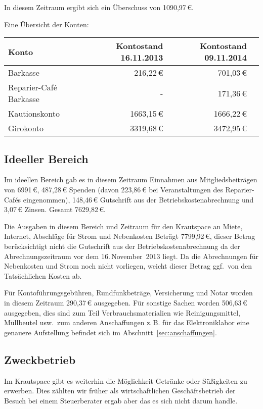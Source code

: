 \documentclass[10pt,DIV16]{scrartcl}
\begin{document}
In diesem Zeitraum ergibt sich ein Überschuss von 1090,97\,\euro{}.

Eine Übersicht der Konten:
\begin{table}[h!]
	\begin{tabular}{l|r|r|r}
	\textbf{Konto} & \textbf{Kontostand 16.11.2013} & \textbf{Kontostand 09.11.2014} \\ \hline
	Barkasse & 216,22\,\euro & 701,03\,\euro \\
	Reparier-Café Barkasse & - & 171,36\,\euro \\
	Kautionskonto & 1663,15\,\euro & 1666,22\,\euro \\
	Girokonto & 3319,68\,\euro & 3472,95\,\euro \\
	\end{tabular}
\end{table}

\subsection{Ideeller Bereich}
\label{sec:ideeller_bereich}

Im ideellen Bereich gab es in diesem Zeitraum Einnahmen aus Mitgliedsbeiträgen von 6991\,\euro{}, 487,28\,\euro{} Spenden (davon 223,86\,\euro{} bei Veranstaltungen des Reparier-Cafés eingenommen), 148,46\,\euro{} Gutschrift aus der Betriebskostenabrechnung und 3,07\,\euro{} Zinsen.
Gesamt 7629,82\,\euro{}.

Die Ausgaben in diesem Bereich und Zeitraum für den Krautspace an Miete, Internet, Abschläge für Strom und Nebenkosten Beträgt 7799,92\,\euro{}, dieser Betrag berücksichtigt nicht die Gutschrift aus der Betriebskostenabrechnung da der Abrechnungszeitraum vor dem 16.\,November~2013 liegt.
Da die Abrechnungen für Nebenkosten und Strom noch nicht vorliegen, weicht dieser Betrag ggf.\ von den Tatsächlichen Kosten ab.

Für Kontoführungsgebühren, Rundfunkbeträge, Versicherung und Notar worden in diesem Zeitraum 290,37\,\euro{} ausgegeben.
Für sonstige Sachen worden 506,63\,\euro{} ausgegeben, dies sind zum Teil Verbrauchsmaterialien wie Reinigungsmittel, Müllbeutel usw.\ zum anderen Anschaffungen z.\,B. für das Elektroniklabor eine genauere Aufstellung befindet sich im Abschnitt~\ref{sec:anschaffungen}.

\subsection{Zweckbetrieb}
\label{sec:Zweckbetrieb}
Im Krautspace gibt es weiterhin die Möglichkeit Getränke oder Süßigkeiten zu erwerben.
Dies zählten wir früher als wirtschaftlichen Geschäftsbetrieb der Besuch bei einem Steuerberater ergab aber das es sich nicht darum handle.
\end{document}
